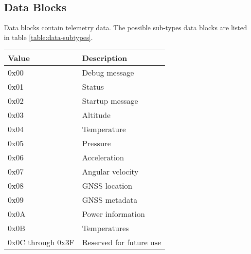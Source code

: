 \subsection{Data Blocks}

Data blocks contain telemetry data. The possible sub-types data blocks are listed in table \ref{table:data-subtypes}.

\begin{table*}[htb]
    \centering
    \begin{tabular}{@{}ll@{}}
        \toprule
        Value             & Description             \\
        \midrule
        0x00              & Debug message           \\
        0x01              & Status                  \\
        0x02              & Startup message         \\
        0x03              & Altitude                \\
        0x04              & Temperature             \\
        0x05              & Pressure                \\
        0x06              & Acceleration            \\
        0x07              & Angular velocity        \\
        0x08              & GNSS location           \\
        0x09              & GNSS metadata           \\
        0x0A              & Power information       \\
        0x0B              & Temperatures            \\
        0x0C through 0x3F & Reserved for future use \\
        \bottomrule
    \end{tabular}
    \caption{Data Block Subtypes}
    \label{table:data-subtypes}
\end{table*}











